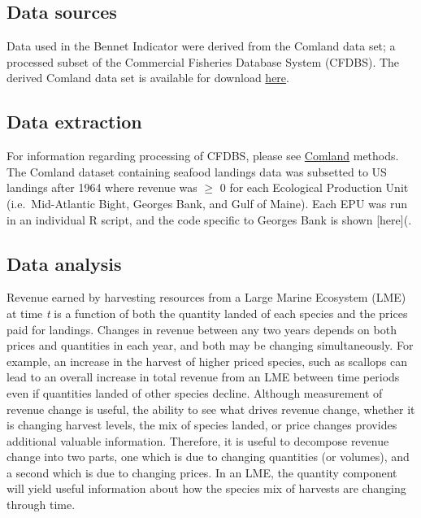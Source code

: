 \documentclass[
]{book}
\begin{document}
\hypertarget{data-sources-3}{%
\subsection{Data sources}\label{data-sources-3}}

Data used in the Bennet Indicator were derived from the Comland data set; a processed subset of the Commercial Fisheries Database System (CFDBS). The derived Comland data set is available for download \href{https://comet.nefsc.noaa.gov/erddap/tabledap/group_landings_soe_v1.html}{here}.

\hypertarget{data-extraction-3}{%
\subsection{Data extraction}\label{data-extraction-3}}

For information regarding processing of CFDBS, please see \protect\hyperlink{comdat}{Comland} methods. The Comland dataset containing seafood landings data was subsetted to US landings after 1964 where revenue was \(\ge\) 0 for each Ecological Production Unit (i.e.~Mid-Atlantic Bight, Georges Bank, and Gulf of Maine). Each EPU was run in an individual R script, and the code specific to Georges Bank is shown {[}here{]}(.

\hypertarget{data-analysis-2}{%
\subsection{Data analysis}\label{data-analysis-2}}

Revenue earned by harvesting resources from a Large Marine Ecosystem (LME) at time \emph{t} is a function of both the quantity landed of each species and the prices paid for landings. Changes in revenue between any two years depends on both prices and quantities in each year, and both may be changing simultaneously. For example, an increase in the harvest of higher priced species, such as scallops can lead to an overall increase in total revenue from an LME between time periods even if quantities landed of other species decline. Although measurement of revenue change is useful, the ability to see what drives revenue change, whether it is changing harvest levels, the mix of species landed, or price changes provides additional valuable information. Therefore, it is useful to decompose revenue change into two parts, one which is due to changing quantities (or volumes), and a second which is due to changing prices. In an LME, the quantity component will yield useful information about how the species mix of harvests are changing through time.
\end{document}
